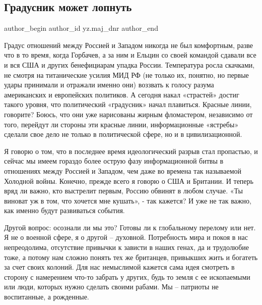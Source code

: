  
 
 
 
 
 
\subsection{Градусник может лопнуть}
\label{sec:25_01_2022.yz.maj_dnr.1.gradusnik}
 
\ifcmt
 author_begin
   author_id yz.maj_dnr
 author_end
\fi

Градус отношений между Россией и Западом никогда не был комфортным, разве что в
то время, когда Горбачев, а за ним и Ельцин со своей командой сдавали все и вся
США и других бенефициарам упадка России. Температура росла скачками, не смотря
на титанические усилия МИД РФ (не только их, понятно, но первые удары принимали
и отражали именно они) воззвать к голосу разума американских и европейских
политиков. А сегодня накал «страстей» достиг такого уровня, что политический
«градусник» начал плавиться. Красные линии, говорите? Боюсь, что они уже
нарисованы жирным фломастером, независимо от того, перейдут ли стороны эти
красные линии, информационные «ястребы» сделали свое дело не только в
политической сфере, но и в цивилизационной.


Я говорю о том, что в последнее время идеологический разрыв стал пропастью, и
сейчас мы имеем гораздо более острую фазу информационной битвы в отношениях
между Россией и Западом, чем даже во времена так называемой Холодной войны.
Конечно, прежде всего я говорю о США и Британии. И теперь вряд ли важно, кто
выстрелит первым, Россию обвинят в любом случае. «Ты виноват уж в том, что
хочется мне кушать», - так кажется? И уже не так важно, как именно будут
развиваться события.

Другой вопрос: осознали ли мы это? Готовы ли к глобальному перелому или нет. Я
не о военной сфере, я о другой – духовной. Потребность мира и покоя в нас
непреодолима, отсутствие привычки к зависти в наших генах, да и трудолюбие
тоже, а потому нам сложно понять тех же британцев, привыкших жить и богатеть за
счет своих колоний. Для нас немыслимой кажется сама идея смотреть в сторону с
намерением что-то забрать у других, будь то земля с ее ископаемыми или люди,
которых нужно сделать своими рабами. Мы – патриоты не воспитанные, а рожденные.


